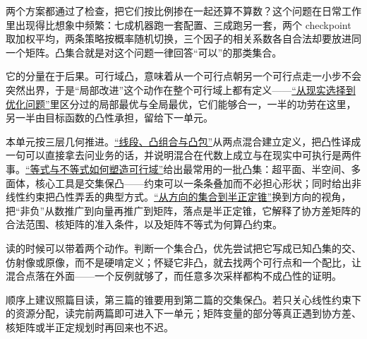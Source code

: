 两个方案都通过了检查，把它们按比例掺在一起还算不算数？这个问题在日常工作里出现得比想象中频繁：七成机器跑一套配置、三成跑另一套，两个 checkpoint 取加权平均，两条策略按概率随机切换，三个因子的相关系数各自合法却要放进同一个矩阵。凸集合就是对这个问题一律回答``可以''的那类集合。

它的分量在于后果。可行域凸，意味着从一个可行点朝另一个可行点走一小步不会突然出界，于是``局部改进''这个动作在整个可行域上都有定义——\hyperref[ch:071]{``从现实选择到优化问题''}里区分过的局部最优与全局最优，它们能够合一，一半的功劳在这里，另一半由目标函数的凸性承担，留给下一单元。

本单元按三层几何推进。\hyperref[sec:09-Convex-Optimization/02-Convex-Sets/01]{``线段、凸组合与凸包''}从两点混合建立定义，把凸性译成一句可以直接拿去问业务的话，并说明混合在代数上成立与在现实中可执行是两件事。\hyperref[sec:09-Convex-Optimization/02-Convex-Sets/02]{``等式与不等式如何塑造可行域''}给出最常用的一批凸集：超平面、半空间、多面体，核心工具是交集保凸——约束可以一条条叠加而不必担心形状；同时给出非线性约束把凸性弄丢的典型方式。\hyperref[sec:09-Convex-Optimization/02-Convex-Sets/03]{``从方向的集合到半正定锥''}换到方向的视角，把``非负''从数推广到向量再推广到矩阵，落点是半正定锥，它解释了协方差矩阵的合法范围、核矩阵的准入条件，以及矩阵不等式为何算凸约束。

读的时候可以带着两个动作。判断一个集合凸，优先尝试把它写成已知凸集的交、仿射像或原像，而不是硬啃定义；怀疑它非凸，就去找两个可行点和一个配比，让混合点落在外面——一个反例就够了，而任意多次采样都构不成凸性的证明。

顺序上建议照篇目读，第三篇的锥要用到第二篇的交集保凸。若只关心线性约束下的资源分配，读完前两篇即可进入下一单元；矩阵变量的部分等真正遇到协方差、核矩阵或半正定规划时再回来也不迟。

